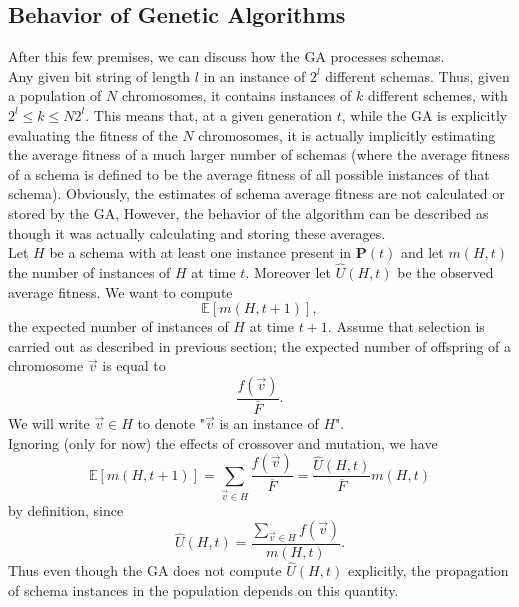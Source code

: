\documentclass[%
    corpo=11pt,
    twoside,
    stile=classica,
    oldstyle,
    autoretitolo,
    tipotesi=magistrale,
    greek,
    evenboxes,
    english
]{toptesi}
\begin{document}
\subsection{Behavior of Genetic Algorithms}
\label{gabehavior}
After this few premises, we can discuss how the GA processes schemas. \\
Any given bit string of length $l$ in an instance of $2^l$ different schemas. Thus, given a population of $N$ chromosomes, it contains instances of $k$ different schemes, with $2^l \leq k \leq N2^l$. This means that, at a given generation $t$, while the GA is explicitly evaluating the fitness of the $N$ chromosomes, it is actually implicitly estimating the average fitness of a much larger number of schemas (where the average fitness of a schema is defined to be the average fitness of all possible instances of that schema). Obviously, the estimates of schema average fitness are not calculated or stored by the GA, However, the behavior of the algorithm can be described as though it was actually calculating and storing these averages. \\
Let $H$ be a schema with at least one instance present in $\textbf{P}(t)$ and let $m(H,t)$ the number of instances of $H$ at time $t$. Moreover let $\hat{U}(H,t)$ be the observed average fitness. We want to compute 
\begin{equation}
\mathbb{E}\left[m(H, t + 1) \right],
\end{equation}
the expected number of instances of $H$ at time $t+1$. Assume that selection is carried out as described in previous section; the expected number of offspring of a chromosome $\vec{v}$ is equal to
\begin{equation}
\frac{f(\vec{v})}{\overline{F}}.
\end{equation}
We will write $\vec{v} \in H$ to denote "$\vec{v}$ is an instance of $H$". \\
Ignoring (only for now) the effects of crossover and mutation, we have
\begin{equation}
\label{expectedmult}
\mathbb{E}\left[m(H, t + 1) \right] = \sum_{\vec{v} \in H}\frac{f(\vec{v})}{\overline{F}} = \frac{\hat{U}(H,t)}{\overline{F}}m(H,t)
\end{equation}
by definition, since
\begin{equation}
\hat{U}(H,t) = \frac{\sum_{\vec{v} \in H}f(\vec{v})}{m(H,t)}.
\end{equation}
Thus even though the GA does not compute $\hat{U}(H,t)$ explicitly, the propagation of schema instances in the population depends on this quantity. \\
\end{document}
